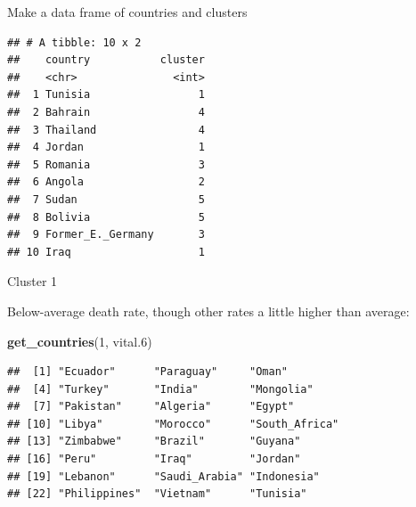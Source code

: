 \documentclass[ignorenonframetext,]{beamer}
\newenvironment{Shaded}{\begin{snugshade}}{\end{snugshade}}
\newcommand{\DataTypeTok}[1]{\textcolor[rgb]{0.13,0.29,0.53}{#1}}
\newcommand{\DecValTok}[1]{\textcolor[rgb]{0.00,0.00,0.81}{#1}}
\newcommand{\FloatTok}[1]{\textcolor[rgb]{0.00,0.00,0.81}{#1}}
\newcommand{\KeywordTok}[1]{\textcolor[rgb]{0.13,0.29,0.53}{\textbf{#1}}}
\newcommand{\NormalTok}[1]{#1}
\newcommand{\OperatorTok}[1]{\textcolor[rgb]{0.81,0.36,0.00}{\textbf{#1}}}
\newcommand{\StringTok}[1]{\textcolor[rgb]{0.31,0.60,0.02}{#1}}
\begin{document}
\begin{frame}[fragile]{Make a data frame of countries and clusters}
\protect\hypertarget{make-a-data-frame-of-countries-and-clusters}{}

\begin{Shaded}
\end{Shaded}

\begin{verbatim}
## # A tibble: 10 x 2
##    country           cluster
##    <chr>               <int>
##  1 Tunisia                 1
##  2 Bahrain                 4
##  3 Thailand                4
##  4 Jordan                  1
##  5 Romania                 3
##  6 Angola                  2
##  7 Sudan                   5
##  8 Bolivia                 5
##  9 Former_E._Germany       3
## 10 Iraq                    1
\end{verbatim}

\end{frame}

\begin{frame}[fragile]{Cluster 1}
\protect\hypertarget{cluster-1-1}{}

Below-average death rate, though other rates a little higher than
average:

\begin{Shaded}
\begin{Highlighting}[]
\KeywordTok{get_countries}\NormalTok{(}\DecValTok{1}\NormalTok{, vital}\FloatTok{.6}\NormalTok{)}
\end{Highlighting}
\end{Shaded}

\begin{verbatim}
##  [1] "Ecuador"      "Paraguay"     "Oman"        
##  [4] "Turkey"       "India"        "Mongolia"    
##  [7] "Pakistan"     "Algeria"      "Egypt"       
## [10] "Libya"        "Morocco"      "South_Africa"
## [13] "Zimbabwe"     "Brazil"       "Guyana"      
## [16] "Peru"         "Iraq"         "Jordan"      
## [19] "Lebanon"      "Saudi_Arabia" "Indonesia"   
## [22] "Philippines"  "Vietnam"      "Tunisia"
\end{verbatim}

\end{frame}
\end{document}
